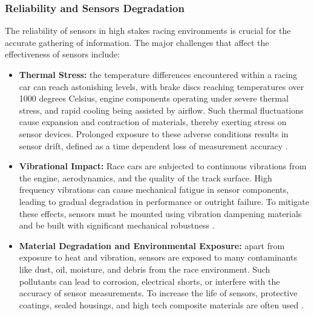 \documentclass[a4paper,final,12pt]{report}
\begin{document}
\subsubsection{Reliability and Sensors Degradation}
The reliability of sensors in high stakes racing environments is crucial for the accurate gathering of information. The major challenges that affect the effectiveness of sensors include:
\begin{itemize}
    \item \textbf{Thermal Stress: }the temperature differences encountered within a racing car can reach astonishing levels, with brake discs reaching temperatures over 1000 degrees Celsius, engine components operating under severe thermal stress, and rapid cooling being assisted by airflow. Such thermal fluctuations cause expansion and contraction of materials, thereby exerting stress on sensor devices. Prolonged exposure to these adverse conditions results in sensor drift, defined as a time dependent loss of measurement accuracy 
    \cite{thermal_sensors}.
    \item \textbf{Vibrational Impact: }Race cars are subjected to continuous vibrations from the engine, aerodynamics, and the quality of the track surface. High frequency vibrations can cause mechanical fatigue in sensor components, leading to gradual degradation in performance or outright failure. To mitigate these effects, sensors must be mounted using vibration dampening materials and be built with significant mechanical robustness \cite{vibration_sensors}.
    \item \textbf{Material Degradation and Environmental Exposure: }apart from exposure to heat and vibration, sensors are exposed to many contaminants like dust, oil, moisture, and debris from the race environment. Such pollutants can lead to corrosion, electrical shorts, or interfere with the accuracy of sensor measurements. To increase the life of sensors, protective coatings, sealed housings, and high tech composite materials are often used \cite{sensor_protection}.
\end{itemize}
\end{document}
